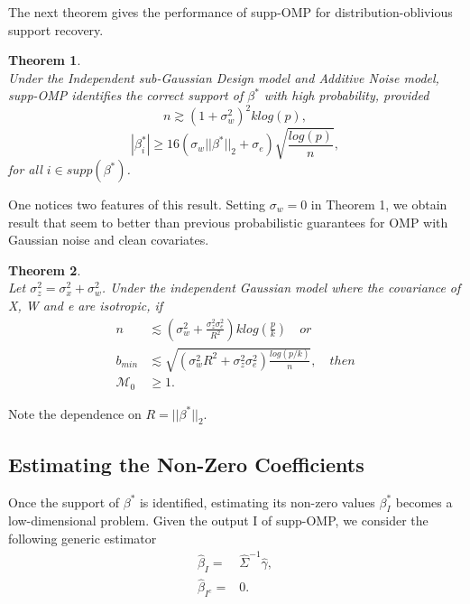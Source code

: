 \documentclass[a4paper,10pt]{article}
\newtheorem{theorem}{Theorem}
\theoremstyle{definition}
\begin{document}
The next theorem gives the performance of supp-OMP for distribution-oblivious support recovery.

\begin{theorem}\ \\
	Under the Independent sub-Gaussian Design model and Additive Noise model, supp-OMP identifies the correct support of $\beta^*$ with high probability, provided
	\begin{equation*}
		n \gtrsim (1+\sigma^2_w)^2klog(p),
	\end{equation*}
	\begin{equation*}
		|\beta^*_i| \geq 16(\sigma_w||\beta^*||_2 + \sigma_e)\sqrt{\frac{log(p)}{n}},
	\end{equation*}
	for all $i \in supp(\beta^*)$.
\end{theorem}
One notices two features of this result. Setting $\sigma_w = 0$ in Theorem 1, we obtain result that seem to better than previous probabilistic guarantees for OMP with Gaussian noise and clean covariates.



\begin{theorem}\ \\
	Let $\sigma^2_z = \sigma^2_x + \sigma^2_w$. Under the independent Gaussian model where the covariance of X, W and e are isotropic, if 
	\begin{align*}
		n &\lesssim (\sigma^2_w + \frac{\sigma^2_z \sigma^2_e}{R^2})k log(\frac{p}{k}) \quad or\\
		b_{min} &\lesssim \sqrt{(\sigma^2_w R^2 + \sigma^2_z \sigma^2_e) \frac{log(p/k)}{n}}, \quad then\\
		\mathcal{M}_0 &\geq 1.
	\end{align*}
\end{theorem}
Note the dependence on $R = ||\beta^*||_2$.

\subsection{Estimating the Non-Zero Coefficients}
Once the support of $\beta^*$ is identified, estimating its non-zero values $\beta^*_I$ becomes a low-dimensional problem. Given the output I of supp-OMP, we consider the following generic estimator
\begin{align}
	\hat{\beta}_I =& \hat{\Sigma}^{-1}\hat{\gamma},\\
	\hat{\beta}_{I^c} =& 0.
\end{align}
\end{document}
